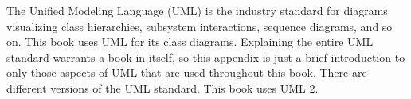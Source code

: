 The Unified Modeling Language (UML) is the industry standard for diagrams visualizing class hierarchies, subsystem interactions, sequence diagrams, and so on. This book uses UML for its class diagrams. Explaining the entire UML standard warrants a book in itself, so this appendix is just a brief introduction to only those aspects of UML that are used throughout this book. There are different versions of the UML standard. This book uses UML 2.